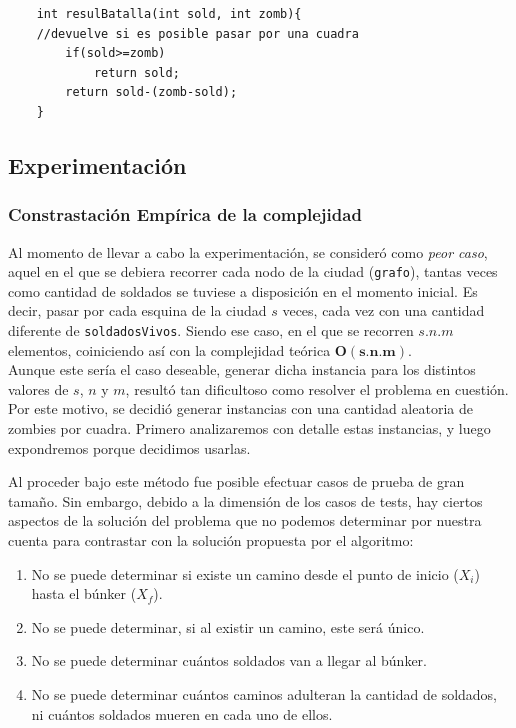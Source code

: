 	\begin{codesnippet}
	\begin{verbatim}
    int resulBatalla(int sold, int zomb){
    //devuelve si es posible pasar por una cuadra
        if(sold>=zomb)
            return sold;
        return sold-(zomb-sold); 
    }
	\end{verbatim}
	\end{codesnippet}

\newpage

\subsection{Experimentaci\'on}
\subsubsection{Constrastaci\'on Emp\'irica de la complejidad}

Al momento de llevar a cabo la experimentaci\'on, se consideró como\emph{ peor caso}, aquel en el que se debiera recorrer cada nodo de la ciudad (\texttt{grafo}), tantas veces como cantidad de soldados se tuviese a disposici\'on en el momento inicial. Es decir, pasar por cada esquina de la ciudad $s$ veces, cada vez con una cantidad diferente de \texttt{soldadosVivos}. Siendo ese caso, en el que se recorren $s.n.m$ elementos, coiniciendo así con la complejidad teórica $\mathbf{O(s.n.m)}$.\\

Aunque este ser\'ia el caso deseable, generar dicha instancia para los distintos valores de $s$, $n$ y $m$, resultó tan dificultoso como resolver el problema en cuestión. Por este motivo, se decidi\'o generar instancias con una cantidad aleatoria de zombies por cuadra.
Primero analizaremos con detalle estas instancias, y luego expondremos porque decidimos usarlas.

Al proceder bajo este m\'etodo fue posible efectuar casos de prueba de gran tamaño. Sin embargo, debido a la dimensi\'on de los casos de tests, hay ciertos aspectos de la soluci\'on del problema que no podemos determinar por nuestra cuenta para contrastar con la soluci\'on propuesta por el algoritmo:

\begin{enumerate}
	\item No se puede determinar si existe un camino desde el punto de inicio ($X_i$) hasta el búnker ($X_f$).
	\item No se puede determinar, si al existir un camino, este será único. 
	\item No se puede determinar cu\'antos soldados van a llegar al búnker.
	\item No se puede determinar cu\'antos caminos adulteran la cantidad de soldados, ni cu\'antos soldados mueren en cada uno de ellos.
\end{enumerate}

